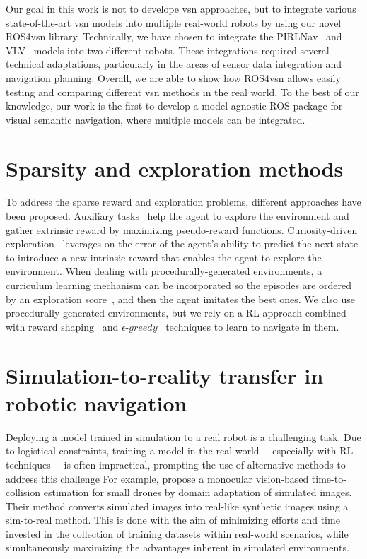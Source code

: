 Our goal in this work is not to develope \acrshort{vsn} approaches, but to integrate various state-of-the-art \acrshort{vsn} models into multiple real-world robots by using our novel ROS4\acrshort{vsn} library.
Technically, we have chosen to integrate the PIRLNav~\cite{ramrakhya2023} and VLV~\cite{chang2020} models into two different robots.
These integrations required several technical adaptations, particularly in the areas of sensor data integration and navigation planning.
Overall, we are able to show how ROS4\acrshort{vsn} allows easily testing and comparing different \acrshort{vsn} methods in the real world.
To the best of our knowledge, our work is the first to develop a model agnostic ROS package for visual semantic navigation, where multiple models can be integrated.

\section{Sparsity and exploration methods}\label{sec:sparsity-and-exploration-methods}
To address the sparse reward and exploration problems, different approaches have been proposed.
Auxiliary tasks~\cite{jaderberg2016, ye2021} help the agent to explore the environment and gather extrinsic reward by maximizing pseudo-reward functions.
Curiosity-driven exploration~\cite{pathak2017} leverages on the error of the agent's ability to predict the next state to introduce a new intrinsic reward that enables the agent to explore the environment.
When dealing with procedurally-generated environments, a curriculum learning mechanism can be incorporated so the episodes are ordered by an exploration score~\cite{zha2020b}, and then the agent imitates the best ones.
We also use procedurally-generated environments, but we rely on a RL approach combined with reward shaping~\cite{ng1999, jestel2021} and $\epsilon\text{-}greedy$~\cite{mnih2013} techniques to learn to navigate in them.

\section{Simulation-to-reality transfer in robotic navigation}\label{sec:simulation-to-reality-transfer-in-robotic-navigation}
Deploying a model trained in simulation to a real robot is a challenging task.
Due to logistical constraints, training a model in the real world —especially with RL techniques— is often impractical, prompting the use of alternative methods to address this challenge
For example, \cite{kim2022} propose a monocular vision-based time-to-collision estimation for small drones by domain adaptation of simulated images.
Their method converts simulated images into real-like synthetic images using a sim-to-real method.
This is done with the aim of minimizing efforts and time invested in the collection of training datasets within real-world scenarios, while simultaneously maximizing the advantages inherent in simulated environments.

